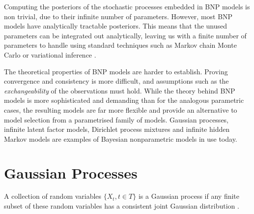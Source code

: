 \documentclass[a4paper,12pt ]{report}
\begin{document}
Computing the posteriors of the stochastic processes embedded in BNP models is non trivial, due to their infinite number of parameters. However, most BNP models have analytically tractable posteriors. This means that the unused parameters can be integrated out analytically, leaving us with a finite number of parameters to handle using standard techniques such as Markov chain Monte Carlo or variational inference \cite{orbanzteh}.

The theoretical properties of BNP models are harder to establish. Proving convergence and consistency is more difficult, and assumptions such as the \emph{exchangeability} of the observations must hold. While the theory behind BNP models is more sophisticated and demanding than for the analogous parametric cases, the resulting models are far more flexible and provide an alternative to model selection from a parametrised family of models. Gaussian processes, infinite latent factor models, Dirichlet process mixtures and infinite hidden Markov models are examples of Bayesian nonparametric models in use today. %

\section{Gaussian Processes}

A collection of random variables $\{ X_t, t \in T \}$ is a Gaussian process if any finite subset of these random variables has a consistent joint Gaussian distribution \citep{rasmussenGPs}.
\end{document}
